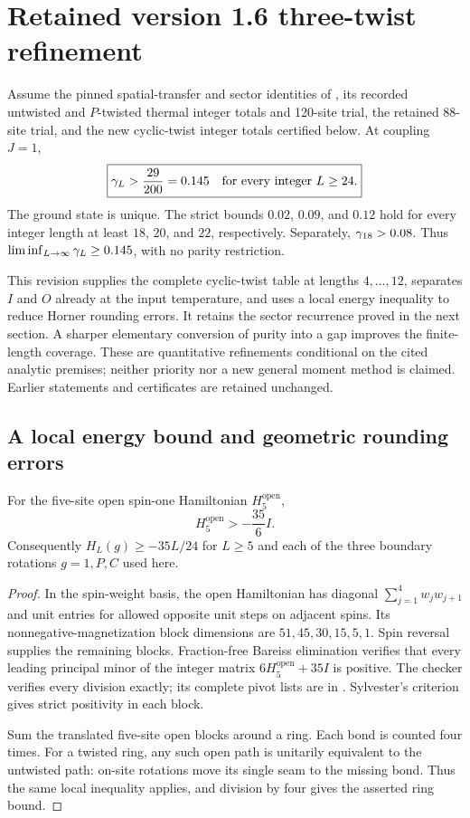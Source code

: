 \section{Retained version 1.6 three-twist refinement}
\label{sec:resolved}
\begin{theorem}\label{thm:resolved}
Assume the pinned spatial-transfer and sector identities of
\cite{upstream}, its recorded untwisted and $P$-twisted thermal integer
totals and 120-site trial, the retained 88-site trial, and the new
cyclic-twist integer totals certified below. At coupling $J=1$,
\[
 \boxed{\gamma_L>\frac{29}{200}=0.145
 \quad\text{for every integer }L\ge24.}
\]
The ground state is unique. The strict bounds $0.02$, $0.09$, and
$0.12$ hold for every integer length at least $18$, $20$, and $22$,
respectively. Separately, $\gamma_{18}>0.08$.
Thus $\liminf_{L\to\infty}\gamma_L\ge0.145$, with no parity restriction.
\end{theorem}

This revision supplies the complete cyclic-twist table at lengths
$4,\ldots,12$, separates $I$ and $O$ already at the input temperature,
and uses a local energy inequality to reduce Horner rounding errors.
It retains the sector recurrence proved in the next section. A sharper
elementary conversion of purity into a gap improves the finite-length
coverage. These are quantitative refinements conditional on the cited
analytic premises; neither priority nor a new general moment method is
claimed. Earlier statements and certificates are retained unchanged.

\subsection{A local energy bound and geometric rounding errors}
\begin{lemma}\label{lem:local-energy}
For the five-site open spin-one Hamiltonian $H^{\mathrm{open}}_5$,
\[
 H^{\mathrm{open}}_5>-\frac{35}{6}I.
\]
Consequently $H_L(g)\ge-35L/24$ for $L\ge5$ and each of the three
boundary rotations $g=1,P,C$ used here.
\end{lemma}
\begin{proof}
In the spin-weight basis, the open Hamiltonian has diagonal
$\sum_{j=1}^{4}w_jw_{j+1}$ and unit entries for allowed opposite unit
steps on adjacent spins. Its nonnegative-magnetization block dimensions
are $51,45,30,15,5,1$. Spin reversal supplies the remaining blocks.
Fraction-free Bareiss elimination verifies that every leading principal
minor of the integer matrix $6H^{\mathrm{open}}_5+35I$ is positive.
The checker verifies every division exactly; its complete pivot lists
are in .
Sylvester's criterion gives strict positivity in each block.

Sum the translated five-site open blocks around a ring. Each bond is
counted four times. For a twisted ring, any such open path is unitarily
equivalent to the untwisted path: on-site rotations move its single
seam to the missing bond. Thus the same local inequality applies, and
division by four gives the asserted ring bound.
\end{proof}

